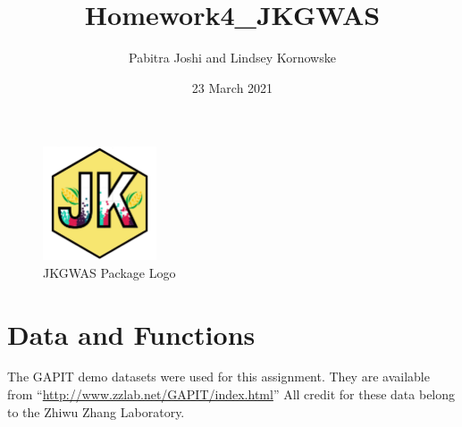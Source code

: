 \documentclass[
]{article}
\title{Homework4\_JKGWAS}
\author{Pabitra Joshi and Lindsey Kornowske}
\date{23 March 2021}
\begin{document}
\maketitle

{
\setcounter{tocdepth}{6}
\tableofcontents
}
\begin{figure}[htbp]
\begin{center}
\includegraphics[width = 0.3\textwidth]{JKGWAS_logo.png}
  \caption{JKGWAS Package Logo}
  \label{fig:logo}
\end{center}
\end{figure}

\hypertarget{data-and-functions}{%
\section{Data and Functions}\label{data-and-functions}}

The GAPIT demo datasets were used for this assignment. They are
available from ``\url{http://www.zzlab.net/GAPIT/index.html}'' All
credit for these data belong to the Zhiwu Zhang Laboratory.
\end{document}
